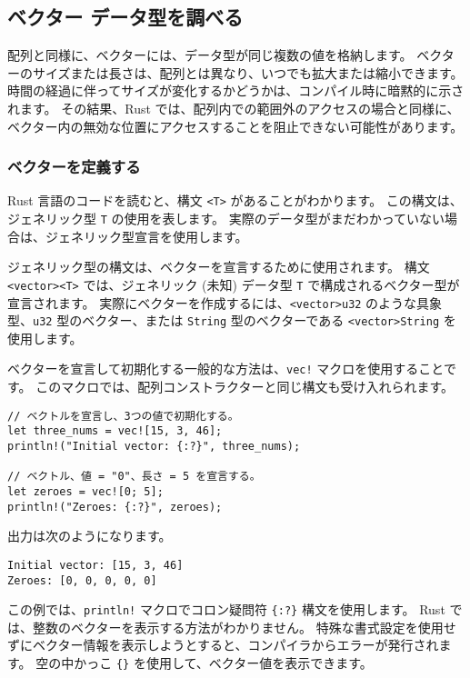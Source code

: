 \subsection{ベクター データ型を調べる}

配列と同様に、ベクターには、データ型が同じ複数の値を格納します。 ベクターのサイズまたは長さは、配列とは異なり、いつでも拡大または縮小できます。 時間の経過に伴ってサイズが変化するかどうかは、コンパイル時に暗黙的に示されます。 その結果、Rust では、配列内での範囲外のアクセスの場合と同様に、ベクター内の無効な位置にアクセスすることを阻止できない可能性があります。

\subsubsection{ベクターを定義する}

Rust 言語のコードを読むと、構文 \texttt{<T>} があることがわかります。 この構文は、ジェネリック型 \texttt{T} の使用を表します。 実際のデータ型がまだわかっていない場合は、ジェネリック型宣言を使用します。

ジェネリック型の構文は、ベクターを宣言するために使用されます。 構文 \texttt{<vector><T>} では、ジェネリック (未知) データ型 \texttt{T} で構成されるベクター型が宣言されます。 実際にベクターを作成するには、\texttt{<vector>u32} のような具象型、\texttt{u32} 型のベクター、または \texttt{String} 型のベクターである \texttt{<vector>String} を使用します。

ベクターを宣言して初期化する一般的な方法は、\texttt{vec!} マクロを使用することです。 このマクロでは、配列コンストラクターと同じ構文も受け入れられます。


\begin{lstlisting}[numbers=none]
// ベクトルを宣言し、3つの値で初期化する。
let three_nums = vec![15, 3, 46];
println!("Initial vector: {:?}", three_nums);  
  
// ベクトル、値 = "0"、長さ = 5 を宣言する。
let zeroes = vec![0; 5];
println!("Zeroes: {:?}", zeroes); 
\end{lstlisting}

出力は次のようになります。

\begin{lstlisting}[numbers=none]
Initial vector: [15, 3, 46]
Zeroes: [0, 0, 0, 0, 0]
\end{lstlisting}

この例では、\texttt{println!} マクロでコロン疑問符 \texttt{\{:?\}} 構文を使用します。 Rust では、整数のベクターを表示する方法がわかりません。 特殊な書式設定を使用せずにベクター情報を表示しようとすると、コンパイラからエラーが発行されます。 空の中かっこ \texttt{\{\}} を使用して、ベクター値を表示できます。

